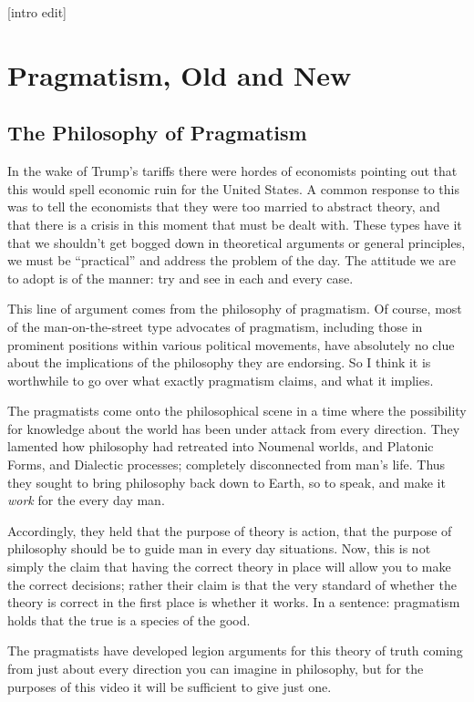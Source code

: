 \documentclass[11pt]{article}
\begin{document}
{[}intro edit]
\section{Pragmatism, Old and New}
\label{sec:orgb9bd6cf}
\subsection{The Philosophy of Pragmatism}
\label{sec:org1937166}
In the wake of Trump's tariffs there were hordes of economists pointing out that this would spell economic ruin for the United States. A common response to this was to tell the economists that they were too married to abstract theory, and that there is a crisis in this moment that must be dealt with. These types have it that we shouldn't get bogged down in theoretical arguments or general principles, we must be ``practical'' and address the problem of the day. The attitude we are to adopt is of the manner: try and see in each and every case.

This line of argument comes from the philosophy of pragmatism. Of course, most of the man-on-the-street type advocates of pragmatism, including those in prominent positions within various political movements, have absolutely no clue about the implications of the philosophy they are endorsing. So I think it is worthwhile to go over what exactly pragmatism claims, and what it implies.

The pragmatists come onto the philosophical scene in a time where the possibility for knowledge about the world has been under attack from every direction. They lamented how philosophy had retreated into Noumenal worlds, and Platonic Forms, and Dialectic processes; completely disconnected from man's life. Thus they sought to bring philosophy back down to Earth, so to speak, and make it \emph{work} for the every day man.

Accordingly, they held that the purpose of theory is action, that the purpose of philosophy should be to guide man in every day situations. Now, this is not simply the claim that having the correct theory in place will allow you to make the correct decisions; rather their claim is that the very standard of whether the theory is correct in the first place is whether it works. In a sentence: pragmatism holds that the true is a species of the good.

The pragmatists have developed legion arguments for this theory of truth coming from just about every direction you can imagine in philosophy, but for the purposes of this video it will be sufficient to give just one.
\end{document}
